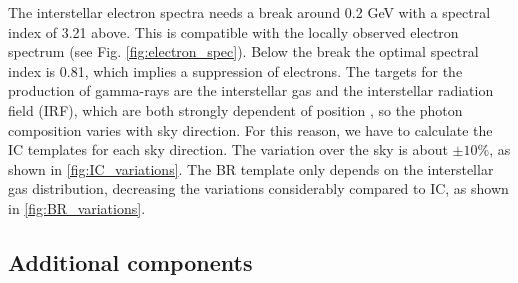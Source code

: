 The interstellar electron spectra needs a break around 0.2 GeV with a spectral index of 3.21 above. This  is compatible with the locally observed electron spectrum (see Fig. \ref{fig:electron_spec}). Below the break the optimal spectral index is 0.81, which implies a suppression of electrons. %
The targets for the production of gamma-rays are the interstellar gas and the interstellar radiation field (IRF), which are both strongly dependent of position%
, so the photon composition varies with sky direction.
For this reason, we have to calculate the IC templates for each sky direction. The variation over the sky is about $\pm 10\%$, as shown in \ref{fig:IC_variations}. 
The BR template only depends on the interstellar gas distribution, decreasing the variations considerably compared to IC, as shown in \ref{fig:BR_variations}.







\subsection{Additional components}

